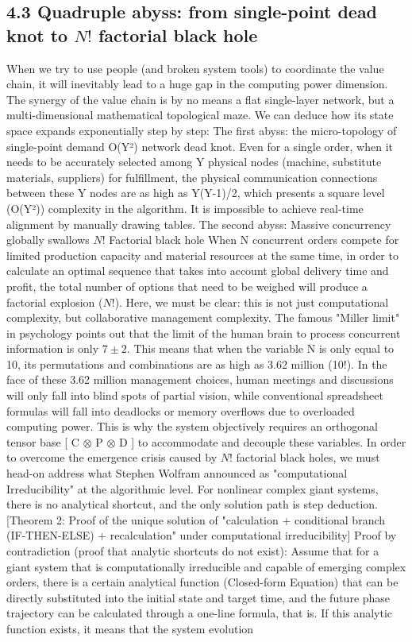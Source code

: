 \documentclass[11pt,a4paper]{article}
\begin{document}
\subsection*{4.3 Quadruple abyss: from single-point dead knot to $N!$ factorial black hole}


When we try to use people (and broken system tools) to coordinate the value chain, it will inevitably lead to a huge gap in the computing power dimension. The synergy of the value chain is by no means a flat single-layer network, but a multi-dimensional mathematical topological maze. We can deduce how its state space expands exponentially step by step: The first abyss: the micro-topology of single-point demand O(Y²) network dead knot. Even for a single order, when it needs to be accurately selected among Y physical nodes (machine, substitute materials, suppliers) for fulfillment, the physical communication connections between these Y nodes are as high as Y(Y-1)/2, which presents a square level (O(Y²)) complexity in the algorithm. It is impossible to achieve real-time alignment by manually drawing tables. The second abyss: Massive concurrency globally swallows $N!$ Factorial black hole When N concurrent orders compete for limited production capacity and material resources at the same time, in order to calculate an optimal sequence that takes into account global delivery time and profit, the total number of options that need to be weighed will produce a factorial explosion ($N!$). Here, we must be clear: this is not just computational complexity, but collaborative management complexity. The famous "Miller limit" in psychology points out that the limit of the human brain to process concurrent information is only $7 \pm 2$. This means that when the variable N is only equal to 10, its permutations and combinations are as high as 3.62 million (10!). In the face of these 3.62 million management choices, human meetings and discussions will only fall into blind spots of partial vision, while conventional spreadsheet formulas will fall into deadlocks or memory overflows due to overloaded computing power. This is why the system objectively requires an orthogonal tensor base [ C $\otimes$ P $\otimes$ D ] to accommodate and decouple these variables. In order to overcome the emergence crisis caused by $N!$ factorial black holes, we must head-on address what Stephen Wolfram announced as "computational Irreducibility" at the algorithmic level. For nonlinear complex giant systems, there is no analytical shortcut, and the only solution path is step deduction. [Theorem 2: Proof of the unique solution of "calculation + conditional branch (IF-THEN-ELSE) + recalculation" under computational irreducibility] Proof by contradiction (proof that analytic shortcuts do not exist): Assume that for a giant system that is computationally irreducible and capable of emerging complex orders, there is a certain analytical function (Closed-form Equation) that can be directly substituted into the initial state and target time, and the future phase trajectory can be calculated through a one-line formula, that is. If this analytic function exists, it means that the system evolution 
\end{document}

